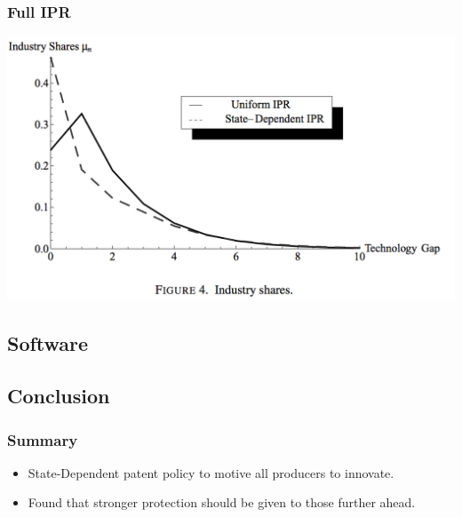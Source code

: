 \documentclass{beamer}
\begin{document}
\begin{frame}[t]\frametitle{Full IPR} 
  \begin{center}
    \includegraphics[scale=.28]{full_ipr_distbn.png}
    \label{fig:full_ipr_distbn}
  \end{center}
\end{frame}


\subsection{Software}
\label{sub:software}

\subsection{Conclusion}
\label{sub:conclusion}

\begin{frame}[t]\frametitle{Summary}
  \begin{itemize}
    \item<+-> State-Dependent patent policy to motive all producers to innovate.
    \item<+-> Found that stronger protection should be given to those further ahead.
  \end{itemize}  
\end{frame}
\end{document}
